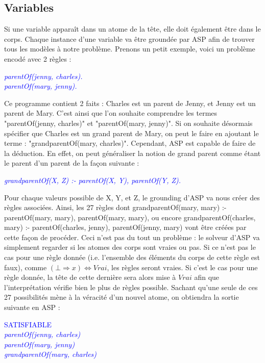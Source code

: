 \documentclass[12pt,a4paper]{article}
\begin{document}
\subsection{Variables}
Si une variable apparaît dans un atome de la tête, elle doit également être dans le corps. Chaque instance d'une variable va être groundée par ASP afin de trouver tous les modèles à notre problème.
Prenons un petit exemple, voici un problème encodé avec 2 règles :
\begin{center}
\emph{
	\textcolor{blue}{
  parentOf(jenny, charles).\\
  parentOf(mary, jenny).
	}
}
\end{center}
Ce programme contient 2 faits : Charles est un parent de Jenny, et Jenny est un parent de Mary. C'est ainsi que l'on souhaite comprendre les termes "parentOf(jenny, charles)" et "parentOf(mary, jenny)".
Si on souhaite désormais spécifier que Charles est un grand parent de Mary, on peut le faire en ajoutant le terme : "grandparentOf(mary, charles)". Cependant, ASP est capable de faire de la déduction.
En effet, on peut généraliser la notion de grand parent comme étant le parent d'un parent de la façon suivante :
\begin{center}
\emph{
	\textcolor{blue}{
  grandparentOf(X, Z) :- parentOf(X, Y), parentOf(Y, Z).
	}
}
\end{center}
Pour chaque valeurs possible de X, Y, et Z, le grounding d'ASP va nous créer des règles associées.
Ainsi, les 27 règles dont grandparentOf(mary, mary) :- parentOf(mary, mary), parentOf(mary, mary), ou encore grandparentOf(charles, mary) :- parentOf(charles, jenny), parentOf(jenny, mary) vont être créées 
par cette façon de procéder. Ceci n'est pas du tout un problème : le solveur d'ASP va simplement regarder si les atomes des corps sont vraies ou pas. Si ce n'est pas le cas pour une règle donnée (i.e. l'ensemble des éléments 
du corps de cette règle est faux), comme $(\bot\Rightarrow x)\Leftrightarrow Vrai$, les règles seront vraies. Si c'est le cas pour une règle donnée, la tête de cette dernière sera alors mise à $Vrai$ afin que l'interprétation 
vérifie bien le plus de règles possible. Sachant qu'une seule de ces 27 possibilités mène à la véracité d'un nouvel atome, on obtiendra la sortie suivante en ASP :
\begin{center}
\textcolor{blue}{
  SATISFIABLE\\
	\emph{
  parentOf(jenny, charles)\\
  parentOf(mary, jenny)\\
  grandparentOf(mary, charles)
	}
}
\end{center}
\end{document}
